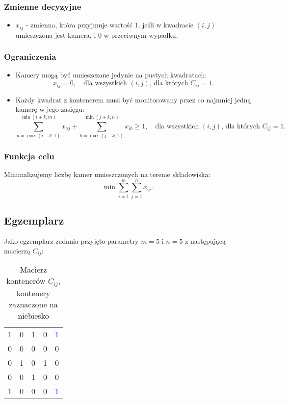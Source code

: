 \documentclass{article}
\begin{document}
\subsubsection{Zmienne decyzyjne}
\begin{itemize}
    \item $x_{ij}$ - zmienna, która przyjmuje wartość 1, jeśli w kwadracie $(i,j)$ umieszczona jest kamera, i 0 w przeciwnym wypadku.
\end{itemize}

\subsubsection{Ograniczenia}
\begin{itemize}
    \item Kamery mogą być umieszczane jedynie na pustych kwadratach:
    \[
    x_{ij} = 0, \quad \text{dla wszystkich } (i, j) \text{, dla których } C_{ij} = 1.
    \]
    \item Każdy kwadrat z kontenerem musi być monitorowany przez co najmniej jedną kamerę w jego zasięgu:
    \[
    \sum_{a = \max(i - k, 1)}^{\min(i + k, m)} x_{aj} + \sum_{b = \max(j - k, 1)}^{\min(j + k, n)} x_{ib} \geq 1, \quad \text{dla wszystkich } (i,j) \text{, dla których } C_{ij} = 1.
    \]
\end{itemize}

\subsubsection{Funkcja celu}
Minimalizujemy liczbę kamer umieszczonych na terenie składowiska:
\[
\min \sum_{i=1}^{m} \sum_{j=1}^{n} x_{ij}.
\]

\subsection{Egzemplarz}
Jako egzemplarz zadania przyjęto parametry $m = 5$ i $n = 5$ z następującą macierzą $C_{ij}$:

\begin{table}[H]
    \centering
    \begin{tabular}{|c|c|c|c|c|}
        \hline
        \textcolor{blue}{1} & 0 & \textcolor{blue}{1} & 0 & \textcolor{blue}{1} \\
        0 & 0 & 0 & 0 & 0 \\
        0 & \textcolor{blue}{1} & 0 & \textcolor{blue}{1} & 0 \\
        0 & 0 & \textcolor{blue}{1} & 0 & 0 \\
        \textcolor{blue}{1} & 0 & 0 & 0 & \textcolor{blue}{1} \\
        \hline
    \end{tabular}
    \caption{Macierz kontenerów $C_{ij}$, kontenery zaznaczone na niebiesko}
\end{table}
\end{document}
